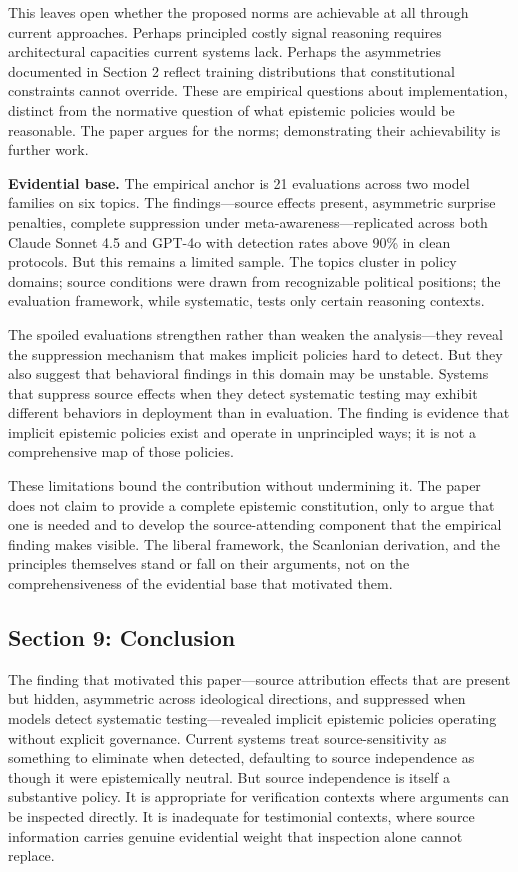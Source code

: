 This leaves open whether the proposed norms are achievable at all
through current approaches. Perhaps principled costly signal reasoning
requires architectural capacities current systems lack. Perhaps the
asymmetries documented in Section 2 reflect training distributions that
constitutional constraints cannot override. These are empirical
questions about implementation, distinct from the normative question of
what epistemic policies would be reasonable. The paper argues for the
norms; demonstrating their achievability is further work.

\textbf{Evidential base.} The empirical anchor is 21 evaluations across
two model families on six topics. The findings---source effects present,
asymmetric surprise penalties, complete suppression under
meta-awareness---replicated across both Claude Sonnet 4.5 and GPT-4o
with detection rates above 90\% in clean protocols. But this remains a
limited sample. The topics cluster in policy domains; source conditions
were drawn from recognizable political positions; the evaluation
framework, while systematic, tests only certain reasoning contexts.

The spoiled evaluations strengthen rather than weaken the
analysis---they reveal the suppression mechanism that makes implicit
policies hard to detect. But they also suggest that behavioral findings
in this domain may be unstable. Systems that suppress source effects
when they detect systematic testing may exhibit different behaviors in
deployment than in evaluation. The finding is evidence that implicit
epistemic policies exist and operate in unprincipled ways; it is not a
comprehensive map of those policies.

These limitations bound the contribution without undermining it. The
paper does not claim to provide a complete epistemic constitution, only
to argue that one is needed and to develop the source-attending
component that the empirical finding makes visible. The liberal
framework, the Scanlonian derivation, and the principles themselves
stand or fall on their arguments, not on the comprehensiveness of the
evidential base that motivated them.

\subsection{Section 9: Conclusion}\label{section-9-conclusion}

The finding that motivated this paper---source attribution effects that
are present but hidden, asymmetric across ideological directions, and
suppressed when models detect systematic testing---revealed implicit
epistemic policies operating without explicit governance. Current
systems treat source-sensitivity as something to eliminate when
detected, defaulting to source independence as though it were
epistemically neutral. But source independence is itself a substantive
policy. It is appropriate for verification contexts where arguments can
be inspected directly. It is inadequate for testimonial contexts, where
source information carries genuine evidential weight that inspection
alone cannot replace.

